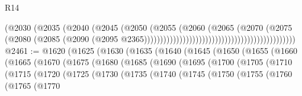 \begin{lexlean}{R14}
\begin{coremodule}
                                                                      (@2030
                                                                        (@2035
                                                                          (@2040
                                                                            (@2045
                                                                              (@2050
                                                                                (@2055
                                                                                  (@2060
                                                                                    (@2065
                                                                                      (@2070
                                                                                        (@2075
                                                                                          (@2080
                                                                                            (@2085
                                                                                              (@2090
                                                                                                (@2095
                                                                                                  @2365)))))))))))))))))))))))))))))))))))))))))))))))
@2461 := @1620
    (@1625
      (@1630
        (@1635
          (@1640
            (@1645
              (@1650
                (@1655
                  (@1660
                    (@1665
                      (@1670
                        (@1675
                          (@1680
                            (@1685
                              (@1690
                                (@1695
                                  (@1700
                                    (@1705
                                      (@1710
                                        (@1715
                                          (@1720
                                            (@1725
                                              (@1730
                                                (@1735
                                                  (@1740
                                                    (@1745
                                                      (@1750
                                                        (@1755
                                                          (@1760
                                                            (@1765
                                                              (@1770

\end{coremodule}
\end{lexlean}
